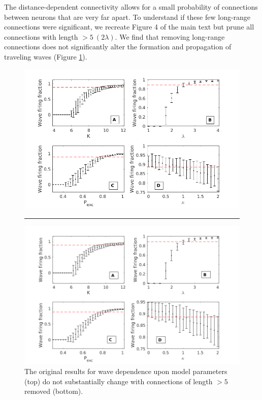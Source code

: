 \documentclass[12pt]{article}
\begin{document}
The distance-dependent connectivity allows for a small probability of connections between neurons that are very far apart.
To understand if these few long-range connections were significant, we recreate Figure 4 of the main text but prune all connections with length $>5\ (2\lambda)$.
We find that removing long-range connections does not significantly alter the formation and propagation of traveling waves (Figure \ref{fig:wave_parameters_nolongconnections}).
\begin{figure}[!htb]
 \centering
 \includegraphics[width=\textwidth]{fig/ParamWaveSim} 
 \rule{\textwidth}{1bp}
 \includegraphics[width=\textwidth]{fig/ParamWaveSim_NoLongConnections}
 \caption{The original results for wave dependence upon model parameters (top) do not substantially change with connections of length $>5$ removed (bottom). }
 \label{fig:wave_parameters_nolongconnections}
\end{figure}
\FloatBarrier
\end{document}
